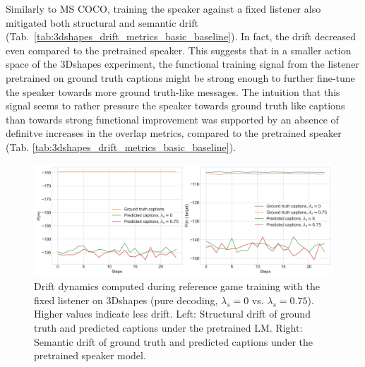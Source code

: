 Similarly to MS COCO, training the speaker against a fixed listener also mitigated both structural and semantic drift (Tab.~\ref{tab:3dshapes_drift_metrics_basic_baseline}). In fact, the drift decreased even compared to the pretrained speaker. This suggests that in a smaller action space of the 3Dshapes experiment, the functional training signal from the listener pretrained on ground truth captions might be strong enough to further fine-tune the speaker towards more ground truth-like messages. The intuition that this signal seems to rather pressure the speaker towards ground truth like captions than towards strong functional improvement was supported by an absence of definitve increases in the overlap metrics, compared to the pretrained speaker (Tab. \ref{tab:3dshapes_drift_metrics_basic_baseline}). 
\begin{figure}[h]
	\centering
	\includegraphics[width=\linewidth]{images/3dshapes_fixedListener_structural_semantic_drift_49_pure_0_075_random.png}
	\caption{Drift dynamics computed during reference game training with the fixed listener on 3Dshapes (pure decoding, $\lambda_s=0$ vs. $\lambda_s=0.75$). Higher values indicate less drift. Left: Structural drift of ground truth and predicted captions under the pretrained LM. Right: Semantic drift of ground truth and predicted captions under the pretrained speaker model.}
	\label{fig:3dshapes_fixed_listener_0_075_str_sem_drift}
\end{figure}

